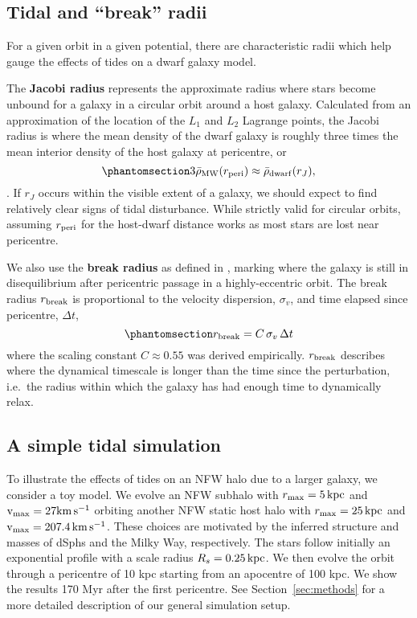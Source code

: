 \subsection{Tidal and ``break'' radii}\label{sec:break_radii}

For a given orbit in a given potential, there are characteristic radii
which help gauge the effects of tides on a dwarf galaxy model.

The \textbf{Jacobi radius} represents the approximate radius where stars
become unbound for a galaxy in a circular orbit around a host galaxy.
Calculated from an approximation of the location of the \(L_1\) and
\(L_2\) Lagrange points, the Jacobi radius is where the mean density of
the dwarf galaxy is roughly three times the mean interior density of the
host galaxy at pericentre, or
\begin{equation}\protect\phantomsection\label{eq:r_jacobi}{
3\bar \rho_{\rm MW}(r_{\rm peri}) \approx \bar \rho_{\rm dwarf}(r_J),
}\end{equation} \citep[ eq. 7-84]{BT1987}. If \(r_J\) occurs within the
visible extent of a galaxy, we should expect to find relatively clear
signs of tidal disturbance. While strictly valid for circular orbits,
assuming \(r_{\rm peri}\) for the host-dwarf distance works as most
stars are lost near pericentre.

We also use the \textbf{break radius} as defined in
\citet{penarrubia+2009}, marking where the galaxy is still in
disequilibrium after pericentric passage in a highly-eccentric orbit.
The break radius \(r_{\rm break}\) is proportional to the velocity
dispersion, \(\sigma_v\), and time elapsed since pericentre,
\(\Delta t\), \begin{equation}\protect\phantomsection\label{eq:r_break}{
r_{\rm break} = C\,\sigma_{v}\,\Delta t
}\end{equation} where the scaling constant \(C \approx 0.55\) was
derived empirically. \(r_{\rm break}\) describes where the dynamical
timescale is longer than the time since the perturbation, i.e.~the
radius within which the galaxy has had enough time to dynamically relax.

\subsection{A simple tidal simulation}\label{a-simple-tidal-simulation}

To illustrate the effects of tides on an NFW halo due to a larger
galaxy, we consider a toy model. We evolve an NFW subhalo with
\(r_{\rm max}=5\,{\rm kpc}\) and \({\rm v}_{\rm max} = 27{\rm km\,s^{-1}}\) orbiting another NFW static
host halo with \(r_{\rm max}=25\,{\rm kpc}\) and \({\rm v}_{\rm max} = 207.4\,{\rm km\,s^{-1}}\). These
choices are motivated by the inferred structure and masses of dSphs and
the Milky Way, respectively. The stars follow initially an exponential
profile with a scale radius \(R_s=0.25\,{\rm kpc}\). We then evolve the orbit
through a pericentre of 10 kpc starting from an apocentre of 100 kpc. We
show the results 170 Myr after the first pericentre. See
Section~\ref{sec:methods} for a more detailed description of our general
simulation setup.

